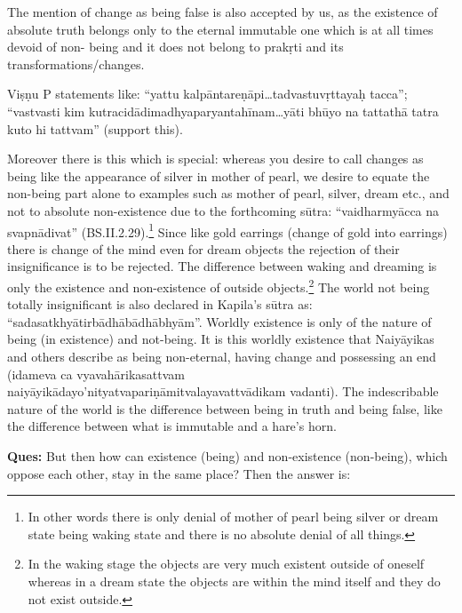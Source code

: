 The mention of change as being false is also accepted by us, as the existence of absolute truth belongs only to the eternal immutable one which is at all times devoid of non- being and it does not belong to prakṛti and its transformations/changes.

Viṣṇu P statements like: “yattu kalpāntareṇāpi…tadvastuvṛttayaḥ tacca”; “vastvasti kim kutracidādimadhyaparyantahīnam…yāti bhūyo na tattathā tatra kuto hi tattvam” (support this).

Moreover there is this which is special: whereas you desire to call changes as being like the appearance of silver in mother of pearl, we desire to equate the non-being part alone to examples such as mother of pearl, silver, dream etc., and not to absolute non-existence due to the forthcoming sūtra: “vaidharmyācca na svapnādivat” (BS.II.2.29).\footnote{In other words there is only denial of mother of pearl being silver or dream state being waking state and there is no absolute denial of all things.} Since like gold earrings (change of gold into earrings) there is change of the mind even for dream objects the rejection of their insignificance is to be rejected. The difference between waking and dreaming is only the existence and non-existence of outside objects.\footnote{In the waking stage the objects are very much existent outside of oneself whereas in a dream state the objects are within the mind itself and they do not exist outside.} The world not being totally insignificant is also declared in Kapila’s sūtra as: “sadasatkhyātirbādhābādhābhyām”.     Worldly existence is only of the nature of being (in existence) and not-being. It is this worldly existence that Naiyāyikas and others describe as being non-eternal, having change and possessing an end (idameva ca vyavahārikasattvam naiyāyikādayo’nityatvapariṇāmitvalayavattvādikam vadanti). The indescribable nature of the world is the difference between being in truth and being false, like the difference between what is immutable and a hare’s horn.

\textbf{Ques:} But then how can existence (being) and non-existence (non-being), which oppose each other, stay in the same place? Then the answer is: 

